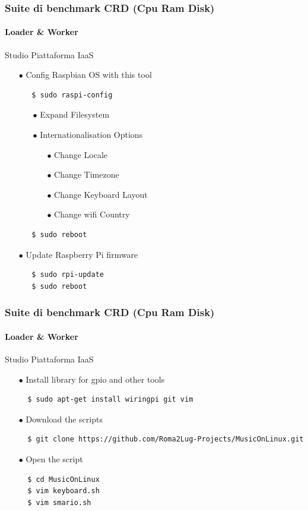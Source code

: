 \documentclass{beamer}
\begin{document}
\begin{frame}[fragile]
	\frametitle{\textbf{Suite di benchmark CRD (Cpu Ram Disk)}}
	\framesubtitle{\textbf{Loader \& Worker}}

	\begin{block}{Studio Piattaforma IaaS}
		\begin{itemize}
			\item[$\bullet$] Config Raspbian OS with this tool
			\begin{lstlisting}
   $ sudo raspi-config
			\end{lstlisting}
			\begin{itemize}
				\item[$\bullet$] Expand Filesystem
				\item[$\bullet$] Internationalisation Options
				\begin{itemize}
					\item[$\bullet$] Change Locale
					\item[$\bullet$] Change Timezone
					\item[$\bullet$] Change Keyboard Layout
					\item[$\bullet$] Change wifi Country
				\end{itemize}
			\end{itemize}
			\begin{lstlisting}
   $ sudo reboot
			\end{lstlisting}
			\item[$\bullet$] Update Raspberry Pi firmware
			\begin{lstlisting}
   $ sudo rpi-update
   $ sudo reboot
			\end{lstlisting}
		\end{itemize}
	\end{block}
\end{frame}


\begin{frame}[fragile]
	\frametitle{\textbf{Suite di benchmark CRD (Cpu Ram Disk)}}
	\framesubtitle{\textbf{Loader \& Worker}}

	\begin{block}{Studio Piattaforma IaaS}
		\begin{itemize}
			\item[$\bullet$] Install library for gpio and other tools
			\begin{lstlisting}
  $ sudo apt-get install wiringpi git vim
			\end{lstlisting}
			\item[$\bullet$] Download the scripts
			\begin{lstlisting}
  $ git clone https://github.com/Roma2Lug-Projects/MusicOnLinux.git
			\end{lstlisting}
			\item[$\bullet$] Open the script
			\begin{lstlisting}
  $ cd MusicOnLinux
  $ vim keyboard.sh
  $ vim smario.sh
			\end{lstlisting}
		\end{itemize}
	\end{block}
\end{frame}
\end{document}

